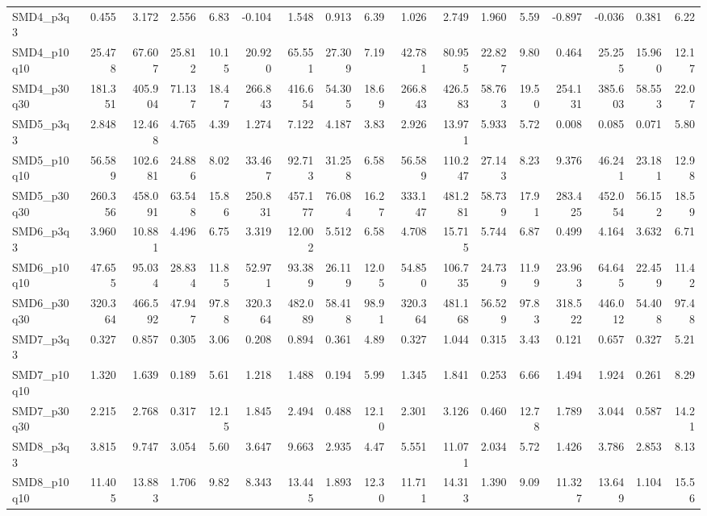 \begin{longtable}{lrrrrrrrrrrrrrrrr}
SMD4\_p3q3 & 0.455 & 3.172 & 2.556 & 6.83 & -0.104 & 1.548 & 0.913 & 6.39 & 1.026 & 2.749 & 1.960 & 5.59 & -0.897 & -0.036 & 0.381 & 6.22 \\
SMD4\_p10q10 & 25.478 & 67.607 & 25.812 & 10.15 & 20.920 & 65.551 & 27.309 & 7.19 & 42.781 & 80.955 & 22.827 & 9.80 & 0.464 & 25.255 & 15.960 & 12.17 \\
SMD4\_p30q30 & 181.351 & 405.904 & 71.137 & 18.47 & 266.843 & 416.654 & 54.305 & 18.69 & 266.843 & 426.583 & 58.763 & 19.50 & 254.131 & 385.603 & 58.553 & 22.07 \\
SMD5\_p3q3 & 2.848 & 12.468 & 4.765 & 4.39 & 1.274 & 7.122 & 4.187 & 3.83 & 2.926 & 13.971 & 5.933 & 5.72 & 0.008 & 0.085 & 0.071 & 5.80 \\
SMD5\_p10q10 & 56.589 & 102.681 & 24.886 & 8.02 & 33.467 & 92.713 & 31.258 & 6.58 & 56.589 & 110.247 & 27.143 & 8.23 & 9.376 & 46.241 & 23.181 & 12.98 \\
SMD5\_p30q30 & 260.356 & 458.091 & 63.548 & 15.86 & 250.831 & 457.177 & 76.084 & 16.27 & 333.147 & 481.281 & 58.739 & 17.91 & 283.425 & 452.054 & 56.152 & 18.59 \\
SMD6\_p3q3 & 3.960 & 10.881 & 4.496 & 6.75 & 3.319 & 12.002 & 5.512 & 6.58 & 4.708 & 15.715 & 5.744 & 6.87 & 0.499 & 4.164 & 3.632 & 6.71 \\
SMD6\_p10q10 & 47.655 & 95.034 & 28.834 & 11.85 & 52.971 & 93.389 & 26.119 & 12.05 & 54.850 & 106.735 & 24.739 & 11.99 & 23.963 & 64.645 & 22.459 & 11.42 \\
SMD6\_p30q30 & 320.364 & 466.592 & 47.947 & 97.88 & 320.364 & 482.089 & 58.418 & 98.91 & 320.364 & 481.168 & 56.529 & 97.83 & 318.522 & 446.012 & 54.408 & 97.48 \\
SMD7\_p3q3 & 0.327 & 0.857 & 0.305 & 3.06 & 0.208 & 0.894 & 0.361 & 4.89 & 0.327 & 1.044 & 0.315 & 3.43 & 0.121 & 0.657 & 0.327 & 5.21 \\
SMD7\_p10q10 & 1.320 & 1.639 & 0.189 & 5.61 & 1.218 & 1.488 & 0.194 & 5.99 & 1.345 & 1.841 & 0.253 & 6.66 & 1.494 & 1.924 & 0.261 & 8.29 \\
SMD7\_p30q30 & 2.215 & 2.768 & 0.317 & 12.15 & 1.845 & 2.494 & 0.488 & 12.10 & 2.301 & 3.126 & 0.460 & 12.78 & 1.789 & 3.044 & 0.587 & 14.21 \\
SMD8\_p3q3 & 3.815 & 9.747 & 3.054 & 5.60 & 3.647 & 9.663 & 2.935 & 4.47 & 5.551 & 11.071 & 2.034 & 5.72 & 1.426 & 3.786 & 2.853 & 8.13 \\
SMD8\_p10q10 & 11.405 & 13.883 & 1.706 & 9.82 & 8.343 & 13.445 & 1.893 & 12.30 & 11.711 & 14.313 & 1.390 & 9.09 & 11.327 & 13.649 & 1.104 & 15.56 \\

\end{longtable}
